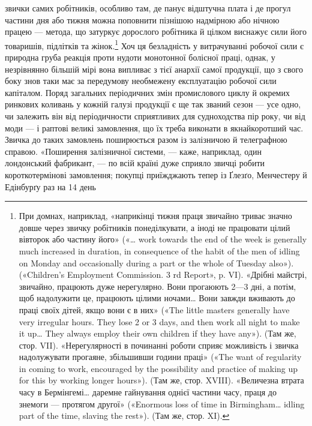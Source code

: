 \parcont{}  %
звички самих робітників, особливо там, де панує відштучна плата
і де прогул частини дня або тижня можна поповнити пізнішою
надмірною або нічною працею — метода, що затуркує дорослого
робітника й цілком виснажує сили його товаришів, підлітків та
жінок.\footnote{
При домнах, наприклад, «наприкінці тижня праця звичайно
триває значно довше через звичку робітників понеділкувати, а іноді не
працювати цілий вівторок або частину його» («\dots{} work towards the
end of the week is generally much increased in duration, in consequence
of the habit of the men of idling on Monday and occasionally during a part
or the whole of Tuesday also»). («Children’s Employment Commission.
3 rd Report», p. VI). «Дрібні майстрі, звичайно, працюють дуже нерегулярно.
Вони прогаюють 2—3 дні, а потім, щоб надолужити це, працюють
цілими ночами\dots{} Вони завжди вживають до праці своїх дітей, якщо вони
є в них» («The little masters generally have very irregular hours. They
lose 2 or 3 days, and then work all night to make it up\dots{} They always employ
their own children if they have any»). (Там же, стор. VII). «Нерегулярності
в починанні роботи сприяє можливість і звичка надолужувати прогаяне,
збільшивши години праці» («The want of regularity in coming to work,
encouraged by the possibility and practice of making up for this by working
longer hours»). (Там же, стор. XVIII). «Величезна втрата часу в Бермінгемі\dots{} даремне гайнування
однієї частини часу, праця до знемоги — протягом другої» («Enormous loss of time in Birmingham\dots{}
idling part of
the time, slaving the rest»). (Там же, стор. XI).
} Хоч ця безладність у витрачуванні робочої сили є
природна груба реакція проти нудоти монотонної болісної
праці, однак, у незрівнянно більшій мірі вона випливає з тієї
анархії самої продукції, що з свого боку знов таки має за передумову необмежену експлуатацію робочої
сили капіталом. Поряд
загальних періодичних змін промислового циклу й окремих ринкових коливань у кожній галузі продукції
є ще так званий сезон — усе одно, чи залежить він від періодичности сприятливих
для судноходства пір року, чи від моди — і раптові великі замовлення, що їх треба виконати в
якнайкоротший час. Звичка до
таких замовлень поширюється разом із залізничою й телеграфною справою. «Поширення залізничної
системи, — каже, наприклад, один лондонський фабрикант, — по всій країні дуже сприяло
звичці робити короткотермінові замовлення; покупці приїжджають тепер із Ґлезґо, Менчестеру й
Едінбурґу раз на 14 день
